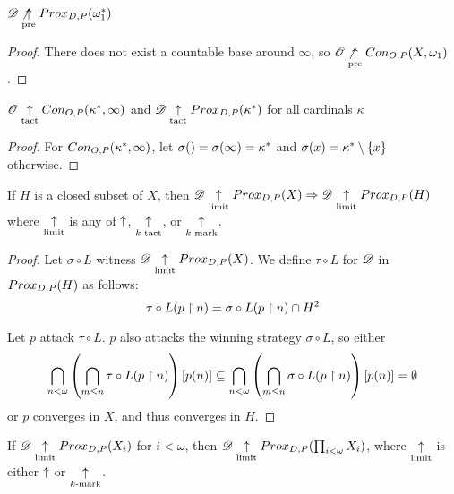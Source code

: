 \begin{example}
  $\mathscr{D} \not\underset{\text{pre}}{\uparrow} Prox_{D,P}(\omega^*_1)$
\end{example}

\begin{proof}
  There does not exist a countable base around $\infty$, so 
    $\mathscr{O} \not\underset{\text{pre}}{\uparrow} Con_{O,P}(X,\omega_1)$.
\end{proof}

\begin{example}
  $\mathscr{O} \underset{\text{tact}}{\uparrow} Con_{O,P}(\kappa^*,\infty)$ and 
  $\mathscr{D} \underset{\text{tact}}{\uparrow} Prox_{D,P}(\kappa^*)$ for all cardinals $\kappa$
\end{example}

\begin{proof}
  For $Con_{O,P}(\kappa^*,\infty)$, let 
    $\sigma()=\sigma(\infty)=\kappa^*$ 
  and 
    $\sigma(x)=\kappa^*\setminus\{x\}$ 
  otherwise.
\end{proof} 


\newpage

\begin{theorem}
  If $H$ is a closed subset of $X$, then 
    $
      \mathscr{D} \underset{\text{limit}}{\uparrow} Prox_{D,P}(X)
        \Rightarrow
      \mathscr{D} \underset{\text{limit}}{\uparrow} Prox_{D,P}(H)
    $
  where $\underset{\text{limit}}{\uparrow}$ is any of $\uparrow$, $\underset{k\text{-tact}}{\uparrow}$, or $\underset{k\text{-mark}}{\uparrow}$.
\end{theorem}

\begin{proof}
  Let $\sigma\circ L$ witness $\mathscr{D} \underset{\text{limit}}{\uparrow} Prox_{D,P}(X)$. We define
  $\tau\circ L$ for $\mathscr{D}$ in $Prox_{D,P}(H)$ as follows:
    \[
      \tau\circ L(p\restriction n)
        =
      \sigma\circ L(p\restriction n)
        \cap
      H^2
    \]

  Let $p$ attack $\tau\circ L$. $p$ also attacks the winning strategy 
  $\sigma\circ L$, so either 
    \[
      \bigcap_{n<\omega}
      \left(\bigcap_{m\leq n}\tau\circ L(p\restriction n)\right)
      [p(n)]
        \subseteq
      \bigcap_{n<\omega}
      \left(\bigcap_{m\leq n}\sigma\circ L(p\restriction n)\right)
      [p(n)]
        =
      \emptyset
    \]
  or $p$ converges in $X$, and thus converges in $H$.
\end{proof}

\begin{theorem}
  If $\mathscr{D}\underset{\text{limit}}{\uparrow} Prox_{D,P}(X_i)$ for $i<\omega$, then
  $\mathscr{D}\underset{\text{limit}}{\uparrow} Prox_{D,P}(\prod_{i<\omega}X_i)$, where $\underset{\text{limit}}{\uparrow}$ is either
  $\uparrow$ or $\underset{k\text{-mark}}{\uparrow}$.
\end{theorem}

